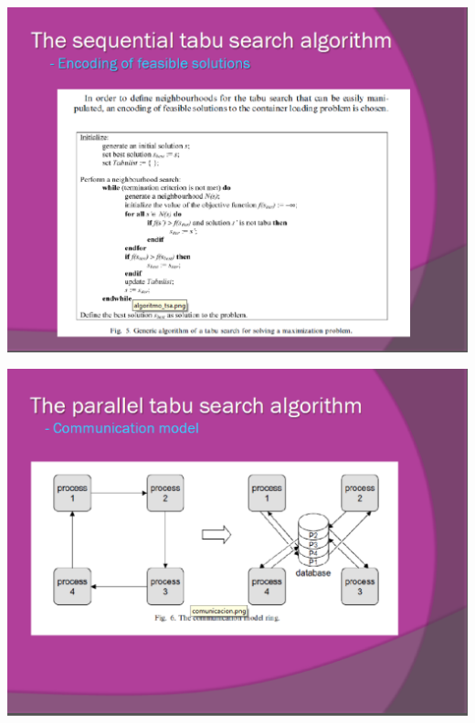 \documentclass[spanish,a4paper,11pt,twoside]{report}
\begin{document}

\begin{center}
\includegraphics[width=1\textwidth]{images/picn11.eps}\\[0.25cm]
\end{center}
\begin{center}
\includegraphics[width=1\textwidth]{images/picn12.eps}\\[0.25cm]
\end{center}
\end{document}
